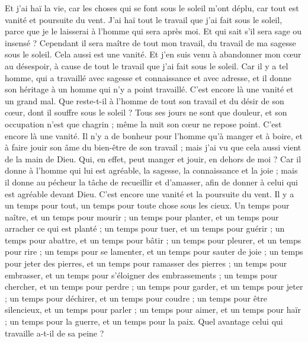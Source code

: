 \begin{multicols}{2}
Et j'ai haï la vie, car les choses qui se font sous le soleil m'ont déplu, car tout est vanité et poursuite du vent.
J'ai haï tout le travail que j’ai fait sous le soleil, parce que je le laisserai à l'homme qui sera après moi.
Et qui sait s'il sera sage ou insensé ? Cependant il sera maître de tout mon travail, du travail de ma sagesse sous le soleil. Cela aussi est une vanité.
Et j’en suis venu à abandonner mon cœur au désespoir, à cause de tout le travail que j’ai fait sous le soleil.
Car il y a tel homme, qui a travaillé avec sagesse et connaissance et avec adresse, et il donne son héritage à un homme qui n'y a point travaillé. C’est encore là une vanité et un grand mal.
Que reste-t-il à l'homme de tout son travail et du désir de son cœur, dont il souffre sous le soleil ?
Tous ses jours ne sont que douleur, et son occupation n’est que chagrin ; même la nuit son cœur ne repose point. C’est encore là une vanité.
Il n’y a de bonheur pour l'homme qu’à manger et à boire, et à faire jouir son âme du bien-être de son travail ; mais j'ai vu que cela aussi vient de la main de Dieu.
Qui, en effet, peut manger et jouir, en dehors de moi ?
Car il donne à l’homme qui lui est agréable, la sagesse, la connaissance et la joie ; mais il donne au pécheur la tâche de recueillir et d’amasser, afin de donner à celui qui est agréable devant Dieu. C’est encore une vanité et la poursuite du vent.
\VerseOne{}Il y a un temps pour tout, un temps pour toute chose sous les cieux.
Un temps pour naître, et un temps pour mourir ; un temps pour planter, et un temps pour arracher ce qui est planté ;
un temps pour tuer, et un temps pour guérir ; un temps pour abattre, et un temps pour bâtir ;
un temps pour pleurer, et un temps pour rire ; un temps pour se lamenter, et un temps pour sauter de joie ;
un temps pour jeter des pierres, et un temps pour ramasser des pierres ; un temps pour embrasser, et un temps pour s'éloigner des embrassements ;
un temps pour chercher, et un temps pour perdre ; un temps pour garder, et un temps pour jeter ;
un temps pour déchirer, et un temps pour coudre ; un temps pour être silencieux, et un temps pour parler ;
un temps pour aimer, et un temps pour haïr ; un temps pour la guerre, et un temps pour la paix.
Quel avantage celui qui travaille a-t-il de sa peine ?

\end{multicols}
